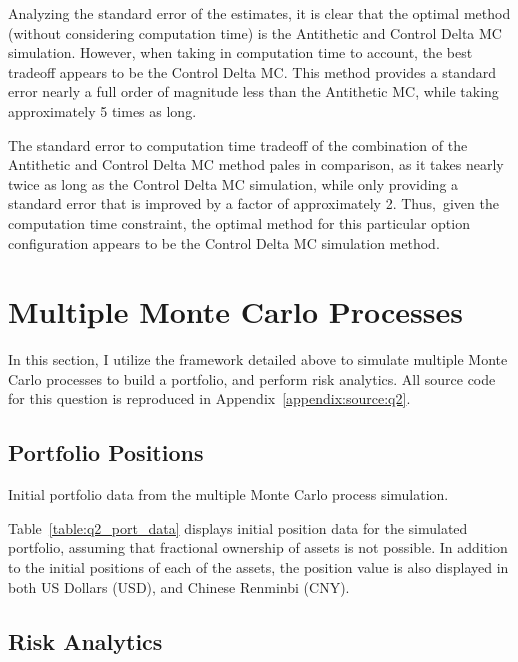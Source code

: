 \documentclass[10pt]{article}
\begin{document}
Analyzing the standard error of the estimates, it is clear that the optimal method (without considering computation time) is the Antithetic and Control Delta MC simulation. However, when taking in computation time to account, the best tradeoff appears to be the Control Delta MC. This method provides a standard error nearly a full order of magnitude less than the Antithetic MC, while taking approximately 5 times as long.

The standard error to computation time tradeoff of the combination of the Antithetic and Control Delta MC method pales in comparison, as it takes nearly twice as long as the Control Delta MC simulation, while only providing a standard error that is improved by a factor of approximately 2. Thus, given the computation time constraint, the optimal method for this particular option configuration appears to be the Control Delta MC simulation method.

\newpage


\section{Multiple Monte Carlo Processes}

In this section, I utilize the framework detailed above to simulate multiple Monte Carlo processes to build a portfolio, and perform risk analytics. All source code for this question is reproduced in Appendix~\ref{appendix:source:q2}.

\subsection{Portfolio Positions}

\begin{table}[!h]
    \centering
    \caption{Initial portfolio data from the multiple Monte Carlo process simulation.}
    \label{table:q2_port_data}
\end{table}

Table~\ref{table:q2_port_data} displays initial position data for the simulated portfolio, assuming that fractional ownership of assets is not possible. In addition to the initial positions of each of the assets, the position value is also displayed in both US Dollars (USD), and Chinese Renminbi (CNY).

\subsection{Risk Analytics}
\end{document}
